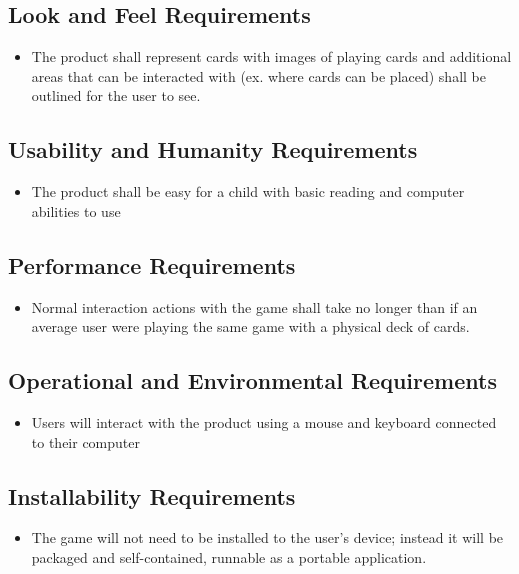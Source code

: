 \documentclass[12pt, titlepage]{article}
\begin{document}
		\subsection{Look and Feel Requirements}
		\begin{itemize}
			\itemsep0em
			\item The product shall represent cards with images of playing 
			cards and additional areas that can be interacted with (ex. where 
			cards can be placed) shall be outlined for the user to see.
		\end{itemize}
		\subsection{Usability and Humanity Requirements}
		\begin{itemize}
			\itemsep0em
			\item The product shall be easy for a child with basic reading and 
			computer abilities to use
		\end{itemize}
		\subsection{Performance Requirements}
		\begin{itemize}
			\itemsep0em
			\item Normal interaction actions with the game shall take no longer 
			than if an average user were playing the same game with a physical 
			deck of cards.
		\end{itemize}
		\subsection{Operational and Environmental Requirements}
		\begin{itemize}
			\itemsep0em
			\item Users will interact with the product using a mouse and 
			keyboard connected to their computer
		\end{itemize}
		\subsection{Installability Requirements}
		\begin{itemize}
			\itemsep0em
			\item The game will not need to be installed to the user's device; instead
			it will be packaged and self-contained, runnable as a portable application.
		\end{itemize}
\end{document}
